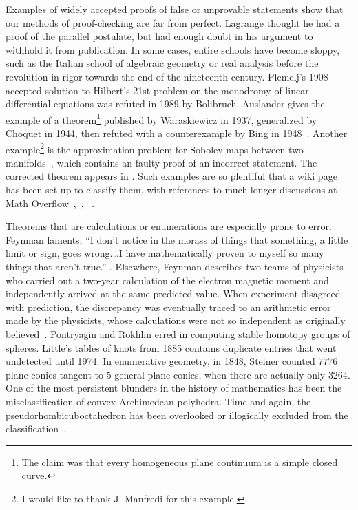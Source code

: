 \documentclass{llncs}
\begin{document}
Examples of widely accepted proofs of false or unprovable statements
show that our methods of proof-checking are far from perfect.    Lagrange
thought he had a proof of the parallel postulate, but had enough doubt
in his argument to withhold it from publication.  In some cases,
entire schools have become sloppy, such as the Italian school of
algebraic geometry or real analysis before the revolution in rigor
towards the end of the nineteenth century.  Plemelj's 1908 accepted
solution to Hilbert's 21st problem on the monodromy of linear
differential equations was refuted in 1989 by Bolibruch.  Auslander
gives the example of a theorem\footnote{The claim was that every
  homogeneous plane continuum is a simple closed curve.}  published by
Waraskiewicz in 1937, generalized by Choquet in 1944, then refuted
with a counterexample by Bing in 1948~\cite{Aus}.  Another
example\footnote{I would like to thank J. Manfredi for this example.}
is the approximation problem for Sobolev maps between two
manifolds~\cite{Bethuel}, which contains an faulty proof of an
incorrect statement.  The corrected theorem appears in \cite{Hang}.
Such examples are so plentiful that a wiki
page has been set up to classify them, with references to much longer discussions
at Math Overflow~\cite{WikiPIP},~\cite{Over1}, ~\cite{Over2}.


Theorems that are calculations or enumerations are especially prone to
error.  Feynman laments, ``I don't notice in the morass of things that something, a
little limit or sign, goes wrong.\dots I have mathematically proven to myself
so many things that aren't true.''
\cite[p.~885]{FeCo}. Elsewhere, Feynman describes two teams of
physicists who carried out a two-year calculation of the electron
magnetic moment and independently arrived at the same predicted value.
When experiment disagreed with prediction, the discrepancy
was eventually traced to an arithmetic error made by the physicists,
whose calculations were not so independent as originally
believed~\cite[p.~117]{FQED}.  Pontryagin and Rokhlin erred in computing stable
homotopy groups of spheres.  Little's tables of knots from 1885
contains duplicate entries that went undetected until 1974.  In
enumerative geometry, in 1848, Steiner counted $7776$ plane conics
tangent to $5$ general plane conics, when there are actually only
$3264$.  One of the most persistent blunders in the history of mathematics
has been the misclassification of convex Archimedean polyhedra.  Time and again,
the pseudorhombicuboctahedron has been overlooked or illogically excluded from
the classification~\cite{Gr11}.
\end{document}
